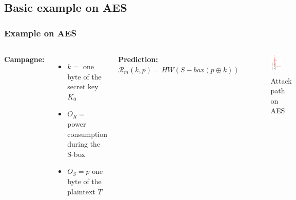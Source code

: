 \documentclass{beamer}
\begin{document}
	\subsection{Basic example on AES}
	\begin{frame}
		\frametitle{Example on AES}
		
		\begin{columns}[T]
			\textbf{Campagne:}\\
			\begin{itemize}
				\item $k = $ one byte of the secret key $K_0$
				\item $O_R = $ power consumption during the S-box
				\item $O_S = p$ one byte of the plaintext $T$
			\end{itemize}
			
			\textbf{Prediction:}\\
			$\mathcal{R}_m(k,p) = HW(S-box(p \oplus k))$
			\begin{figure}
				\includegraphics[width=0.5\textwidth]{attack_path_aes}
				\caption{Attack path on AES}
			\end{figure}
			

\end{columns}
\end{frame}
\end{document}

